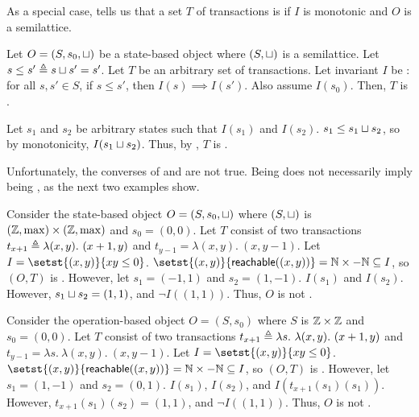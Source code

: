As a special case,  tells us that a set $T$ of
transactions is \Iconfluent{} if $I$ is monotonic and $O$ is a semilattice.

\begin{claim}
  Let $O = (S, s_0, \sqcup)$ be a state-based object where $(S, \sqcup)$ is a
  semilattice. Let $s \leq s' \triangleq s \sqcup s' = s'$. Let $T$ be an arbitrary
  set of transactions. Let invariant $I$ be : for all $s,
  s'\in S$, if $s \leq s'$, then $I(s) \implies I(s')$. Also assume $I(s_0)$.
  Then, $T$ is \Iconfluent{}.
\end{claim}
\begin{elidableproof}
  Let $s_1$ and $s_2$ be arbitrary states such that $I(s_1)$ and $I(s_2)$. $s_1
  \leq s_1 \sqcup s_2$, so by monotonicity, $I(s_1 \sqcup s_2)$. Thus, by
  , $T$ is \Iconfluent{}.
\end{elidableproof}

Unfortunately, the converses of  and
 are not true. Being \Iconfluent{} does not
necessarily imply being \Iclosed{}, as the next two examples show.

\begin{example}
  Consider the state-based object $O = (S, s_0, \sqcup)$ where $(S, \sqcup)$ is
  $(\mathbb{Z}, \max) \times (\mathbb{Z}, \max)$ and $s_0 = (0, 0)$. Let $T$ consist of
  two transactions $t_{x+1} \triangleq \lambda (x, y).\ (x + 1, y)$ and $t_{y-1} =
  \lambda (x, y).\ (x, y - 1)$. Let $I = \setst{(x, y)}{xy \leq 0}$.
  $\setst{(x, y)}{\reachable{(x, y)}} = \nats \times -\nats \subseteq I$, so
  $(O, T)$ is \Iconfluent. However, let $s_1 = (-1, 1)$ and $s_2 = (1, -1)$.
  $I(s_1)$ and $I(s_2)$. However, $s_1 \sqcup s_2 = (1, 1)$, and $\lnot I((1,
  1))$. Thus, $O$ is not \Iclosed{}.
\end{example}

\begin{example}
  Consider the operation-based object $O = (S, s_0)$ where $S$ is $\mathbb{Z} \times
  \mathbb{Z}$ and $s_0 = (0, 0)$. Let $T$ consist of two transactions $t_{x+1}
  \triangleq \lambda s.\ \lambda (x, y).\ (x + 1, y)$ and $t_{y-1} = \lambda s.\
  \lambda (x, y).\ (x, y - 1)$. Let $I = \setst{(x, y)}{xy \leq 0}$.
  $\setst{(x, y)}{\reachable{(x, y)}} = \nats \times -\nats \subseteq I$, so
  $(O, T)$ is \Iconfluent. However, let $s_1 = (1, -1)$ and $s_2 = (0, 1)$.
  $I(s_1)$, $I(s_2)$, and $I(t_{x+1}(s_1)(s_1))$. However, $t_{x+1}(s_1)(s_2) =
  (1, 1)$, and $\lnot I((1, 1))$. Thus, $O$ is not \Iclosed{}.
\end{example}

